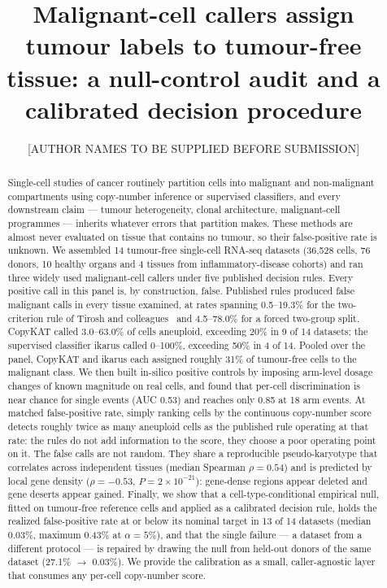\documentclass[11pt]{article}
\title{\bfseries Malignant-cell callers assign tumour labels to tumour-free tissue:
a null-control audit and a calibrated decision procedure}
\author[1]{[AUTHOR NAMES TO BE SUPPLIED BEFORE SUBMISSION]}
\affil[1]{Affiliation}
\date{}
\begin{document}
\maketitle

\begin{abstract}
\noindent
Single-cell studies of cancer routinely partition cells into malignant and
non-malignant compartments using copy-number inference or supervised
classifiers, and every downstream claim --- tumour heterogeneity, clonal
architecture, malignant-cell programmes --- inherits whatever errors that
partition makes. These methods are almost never evaluated on tissue that
contains no tumour, so their false-positive rate is unknown. We assembled
14 tumour-free single-cell RNA-seq datasets (36{,}528 cells, 76 donors, 10
healthy organs and 4 tissues from inflammatory-disease cohorts) and ran three
widely used malignant-cell callers under five published decision rules. Every
positive call in this panel is, by construction, false. Published rules
produced false malignant calls in every tissue examined, at rates spanning
0.5--19.3\% for the two-criterion rule of Tirosh and colleagues~\cite{tirosh2016} and
4.5--78.0\% for a forced two-group split. CopyKAT called 3.0--63.0\% of cells
aneuploid, exceeding 20\% in 9 of 14 datasets; the supervised classifier
ikarus called 0--100\%, exceeding 50\% in 4 of 14. Pooled over the panel,
CopyKAT and ikarus each assigned roughly 31\% of tumour-free cells to the
malignant class. We then built in-silico positive controls by imposing arm-level
dosage changes of known magnitude on real cells, and found that per-cell
discrimination is near chance for single events (AUC 0.53) and reaches only
0.85 at 18 arm events. At matched false-positive rate, simply ranking cells
by the continuous copy-number score detects roughly twice as many aneuploid
cells as the published rule operating at that rate: the rules do not add
information to the score, they choose a poor operating point on it. The false
calls are not random. They share a reproducible pseudo-karyotype that
correlates across independent tissues (median Spearman $\rho = 0.54$) and is
predicted by local gene density ($\rho = -0.53$, $P = 2\times10^{-21}$):
gene-dense regions appear deleted and gene deserts appear gained. Finally, we
show that a cell-type-conditional empirical null, fitted on tumour-free
reference cells and applied as a calibrated decision rule, holds the realized
false-positive rate at or below its nominal target in 13 of 14 datasets
(median 0.03\%, maximum 0.43\% at $\alpha = 5\%$), and that the single failure
--- a dataset from a different protocol --- is repaired by drawing the null
from held-out donors of the same dataset (27.1\% $\rightarrow$ 0.03\%). We
provide the calibration as a small, caller-agnostic layer that consumes any
per-cell copy-number score.
\end{abstract}
\end{document}
